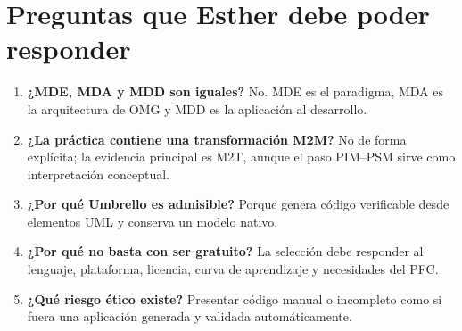 \section{Preguntas que Esther debe poder responder}
\begin{enumerate}
  \item \textbf{¿MDE, MDA y MDD son iguales?} No. MDE es el paradigma, MDA es la arquitectura de OMG y MDD es la aplicación al desarrollo.
  \item \textbf{¿La práctica contiene una transformación M2M?} No de forma explícita; la evidencia principal es M2T, aunque el paso PIM--PSM sirve como interpretación conceptual.
  \item \textbf{¿Por qué Umbrello es admisible?} Porque genera código verificable desde elementos UML y conserva un modelo nativo.
  \item \textbf{¿Por qué no basta con ser gratuito?} La selección debe responder al lenguaje, plataforma, licencia, curva de aprendizaje y necesidades del PFC.
  \item \textbf{¿Qué riesgo ético existe?} Presentar código manual o incompleto como si fuera una aplicación generada y validada automáticamente.
\end{enumerate}

\printbibliography[title={Referencias}]

